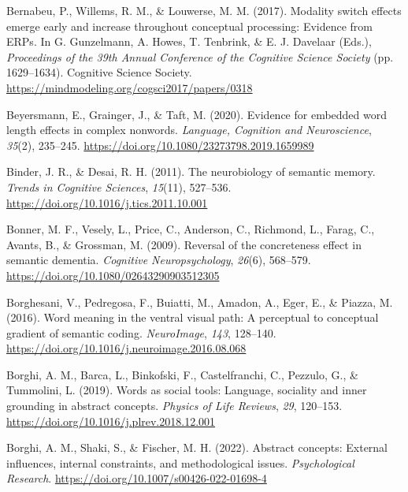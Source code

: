 \documentclass[
  12pt,
  man,floatsintext]{apa7}
\newlength{\cslhangindent}
\newlength{\cslentryspacingunit} %
\newenvironment{CSLReferences}[2] %
 {%
  \setlength{\parindent}{0pt}
  \ifodd #1
  \let\oldpar\par
  \def\par{\hangindent=\cslhangindent\oldpar}
  \fi
  \setlength{\parskip}{#2\cslentryspacingunit}
 }%
 {}
\begin{document}
\begin{CSLReferences}{1}{0}
\leavevmode{}%
Bernabeu, P., Willems, R. M., \& Louwerse, M. M. (2017). Modality switch effects emerge early and increase throughout conceptual processing: {Evidence} from {ERPs}. In G. Gunzelmann, A. Howes, T. Tenbrink, \& E. J. Davelaar (Eds.), \emph{Proceedings of the 39th {Annual Conference} of the {Cognitive Science Society}} (pp. 1629--1634). {Cognitive Science Society}. \url{https://mindmodeling.org/cogsci2017/papers/0318}

\leavevmode{}%
Beyersmann, E., Grainger, J., \& Taft, M. (2020). Evidence for embedded word length effects in complex nonwords. \emph{Language, Cognition and Neuroscience}, \emph{35}(2), 235--245. \url{https://doi.org/10.1080/23273798.2019.1659989}

\leavevmode{}%
Binder, J. R., \& Desai, R. H. (2011). The neurobiology of semantic memory. \emph{Trends in Cognitive Sciences}, \emph{15}(11), 527--536. \url{https://doi.org/10.1016/j.tics.2011.10.001}

\leavevmode{}%
Bonner, M. F., Vesely, L., Price, C., Anderson, C., Richmond, L., Farag, C., Avants, B., \& Grossman, M. (2009). Reversal of the concreteness effect in semantic dementia. \emph{Cognitive Neuropsychology}, \emph{26}(6), 568--579. \url{https://doi.org/10.1080/02643290903512305}

\leavevmode{}%
Borghesani, V., Pedregosa, F., Buiatti, M., Amadon, A., Eger, E., \& Piazza, M. (2016). Word meaning in the ventral visual path: {A} perceptual to conceptual gradient of semantic coding. \emph{NeuroImage}, \emph{143}, 128--140. \url{https://doi.org/10.1016/j.neuroimage.2016.08.068}

\leavevmode{}%
Borghi, A. M., Barca, L., Binkofski, F., Castelfranchi, C., Pezzulo, G., \& Tummolini, L. (2019). Words as social tools: {Language}, sociality and inner grounding in abstract concepts. \emph{Physics of Life Reviews}, \emph{29}, 120--153. \url{https://doi.org/10.1016/j.plrev.2018.12.001}

\leavevmode{}%
Borghi, A. M., Shaki, S., \& Fischer, M. H. (2022). Abstract concepts: External influences, internal constraints, and methodological issues. \emph{Psychological Research}. \url{https://doi.org/10.1007/s00426-022-01698-4}


\end{CSLReferences}
\end{document}
